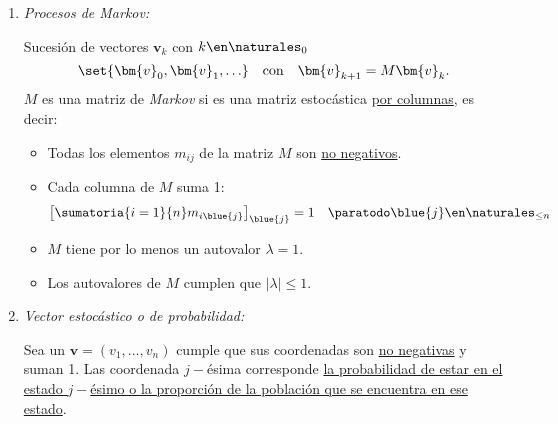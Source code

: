 \begin{enumerate}[label=\tiny\purple{\faIcon{snowman}}]
  \item \textit{Procesos de Markov:}

        Sucesión de vectores $\bm{v}_k$ con $k \en \naturales_0$
        $$
          \set{\bm{v}_0, \bm{v}_1, \ldots}
          \quad
          \text{con}
          \quad
          \bm{v}_{k+1} = M \bm{v}_k.
        $$
        $M$ es una matriz de \textit{Markov} si es una matriz estocástica \underline{por columnas}, es decir:
        \begin{itemize}
          \item Todas los elementos $m_{ij}$ de la matriz $M$ son \underline{no negativos}.

          \item Cada columna de $M$ suma 1:
                $$
                  \left[\sumatoria{i = 1}{n} m_{i\blue{j}}\right]_{\blue{j}} = 1
                  \quad
                  \paratodo \blue{j} \en \naturales_{\leq n}
                $$

          \item $M$ tiene por lo menos un autovalor $\lambda = 1$.

          \item Los autovalores de $M$ cumplen que $|\lambda| \leq 1$.
        \end{itemize}

  \item \textit{Vector estocástico o de probabilidad:}

        Sea un $\bm{v} = (v_1, \ldots, v_n)$ cumple que sus coordenadas son \underline{no negativas} y suman 1.
        Las coordenada $j-$ésima corresponde \ul{la probabilidad de estar en el estado $j-$ésimo o la proporción
          de la población que se encuentra en ese estado}.
\end{enumerate}
